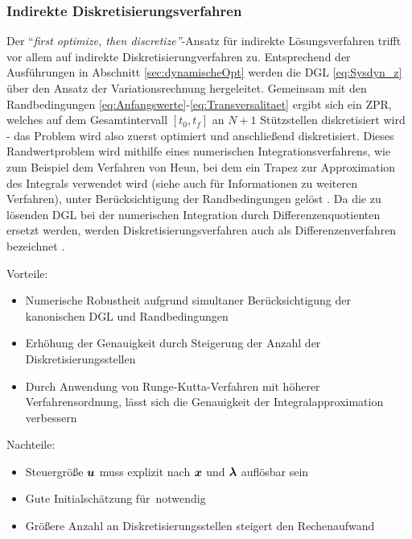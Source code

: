 \subsubsection{Indirekte Diskretisierungsverfahren}\label{subsubsec:Diskretisierungsverfahren_indirekt}
Der ``\textit{first optimize, then discretize''}-Ansatz für indirekte Lösungsverfahren trifft vor allem auf indirekte Diskretisierungverfahren zu. Entsprechend der Ausführungen in Abschnitt \ref{sec:dynamischeOpt} werden die \gls{DGL} \eqref{eq:Sysdyn_z} über den Ansatz der Variationsrechnung hergeleitet. Gemeinsam mit den Randbedingungen \eqref{eq:Anfangswerte}-\eqref{eq:Transversalitaet} ergibt sich ein \gls{ZPR}, welches auf dem Gesamtintervall $[t_0, t_f]$ an $N+1$ Stützstellen diskretisiert wird \cite{KnutGraichen.2012} - das Problem wird also zuerst optimiert und anschließend diskretisiert. Dieses Randwertproblem wird mithilfe eines numerischen Integrationsverfahrens, wie zum Beispiel dem Verfahren von Heun, bei dem ein Trapez zur Approximation des Integrals verwendet wird (siehe auch \cite{Adamy.2009} für Informationen zu weiteren Verfahren), unter Berücksichtigung der Randbedingungen gelöst \cite{KnutGraichen.2012}. Da die zu lösenden \gls{DGL} bei der numerischen Integration durch Differenzenquotienten ersetzt werden, werden Diskretisierungsverfahren auch als Differenzenverfahren bezeichnet \cite{Ascher.1995c5}.
\begin{multicols}{2}
Vorteile:
	\begin{itemize}
		\item Numerische Robustheit aufgrund simultaner Berücksichtigung der kanonischen \gls{DGL} und Randbedingungen \cite{KnutGraichen.2012}
		\item Erhöhung der Genauigkeit durch Steigerung der Anzahl der Diskretisierungsstellen \cite{KnutGraichen.2012}
		\item Durch Anwendung von Runge-Kutta-Verfahren mit höherer Verfahrensordnung, lässt sich die Genauigkeit der Integralapproximation verbessern \cite{Ascher.1995c5}
	\end{itemize}
	
	\columnbreak
	
Nachteile:
	\begin{itemize}
		\item Steuergröße $\boldsymbol{u}$ muss explizit nach $\boldsymbol{x}$ und $\boldsymbol{\lambda}$ auflösbar sein \cite{KnutGraichen.2012}\vspace{\fill}
		\item Gute Initialschätzung für \lambdaoftzero\,notwendig \cite{KnutGraichen.2012}\vspace{\fill}
		\item Größere Anzahl an Diskretisierungsstellen steigert den Rechenaufwand \cite{KnutGraichen.2012}\vspace{\fill}
	\end{itemize}
\end{multicols}

